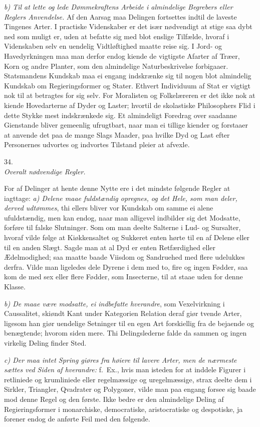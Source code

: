 \documentclass[12pt,a4paper]{article}
\newcommand{\logsec}[2]{%
  \bigskip\begin{center}{\large #1}\\[4pt]{\emph{#2}}\end{center}\smallskip}
\newcommand{\opage}[1]{\marginnote{\footnotesize\textit{[#1]}}}
\begin{document}
\emph{b) Til at lette og lede Dømmekraftens Arbeide i almindelige Begrebers
eller Reglers Anvendelse.} Af den Aarsag maa Delingen fortsettes indtil de
laveste Tingenes Arter. I practiske Videnskaber er det især nødvendigt at stige
saa dybt ned som muligt er, uden at befatte sig med blot enslige Tilfælde,
hvoraf i Videnskaben selv en uendelig Vidtløftighed maatte reise sig. I Jord- og
Havedyrkningen maa man derfor endog kiende de vigtigste Afarter af Træer, Korn
og andre Planter, som den almindelige Naturbeskrivelse forbigaaer. Statsmandens
Kundskab maa ei engang indskrænke sig til nogen blot almindelig Kundskab om
Regieringsformer og Stater. Ethvert Individuum af Stat er vigtigt nok til at
betragtes for sig selv. For Moralisten og Folkelæreren er det ikke nok at
kiende Hovedarterne af Dyder og Laster; hvortil de skolastiske Philosophers Flid
i dette Stykke mest indskrænkede sig. Et almindeligt Foredrag over saadanne
Gienstande bliver gemeenlig ufrugtbart, naar man ei tillige kiender og forstaaer
at anvende det paa de mange Slags Maader, paa hvilke Dyd og Last efter
Personernes udvortes og indvortes Tilstand pleier at afvexle.

\opage{104} \logsec{34.}{Overalt nødvendige Regler.}

\noindent
For af Delinger at hente denne Nytte ere i det mindste følgende Regler at
iagttage: \emph{a) Delene maae fuldstændig opregnes, og det Hele, som man deler,
derved udtømmes}, thi ellers bliver vor Kundskab om samme ei alene
ufuldstændig, men kan endog, naar man alligevel indbilder sig det Modsatte,
forføre til falske Slutninger. Som om man deelte Salterne i Lud- og Sursalter,
hvoraf vilde følge at Kiøkkensaltet og Sukkeret enten hørte til en af Delene
eller til en anden Slægt. Sagde man at al Dyd er enten Retfærdighed eller
Ædelmodighed; saa maatte baade Viisdom og Sandruehed med flere udelukkes
derfra. Vilde man ligeledes dele Dyrene i dem med to, fire og ingen Fødder, saa
kom de med sex eller flere Fødder, som Insecterne, til at staae uden for denne
Klasse.

\emph{b) De maae være modsatte, ei indbefatte hverandre}, som Vexelvirkning i
Caussalitet, skiøndt Kant under Kategorien Relation deraf giør tvende Arter,
ligesom han giør uendelige Setninger til en egen Art forskiellig fra de bejaende
og benægtende; hvorom siden mere. Thi Delingslederne falde da sammen og ingen
virkelig Deling finder Sted.

\emph{c) Der maa intet Spring giøres fra høiere til lavere Arter, men de
nærmeste sættes ved
\opage{105} Siden af hverandre:} f.~Ex., hvis man isteden for at inddele Figurer i
retliniede og krumliniede eller regelmæssige og uregelmæssige, strax deelte dem
i Sirkler, Triangler, Qvadrater og Polygoner, vilde man paa engang forsee sig
baade mod denne Regel og den første. Ikke bedre er den almindelige Deling af
Regieringsformer i monarchiske, democratiske, aristocratiske og despotiske, ja
forener endog de anførte Feil med den følgende.
\end{document}
